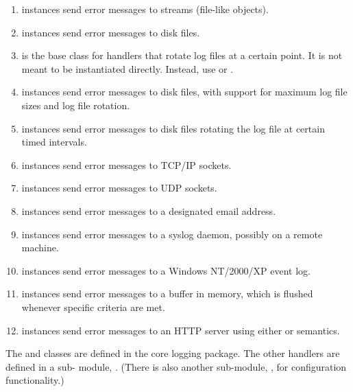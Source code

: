 \begin{enumerate}

\item {} instances send error messages to
streams (file-like objects).

\item {} instances send error messages to disk
files.

\item {} is the base class for handlers that
rotate log files at a certain point. It is not meant to be  instantiated
directly. Instead, use  or
.

\item {} instances send error messages to disk
files, with support for maximum log file sizes and log file rotation.

\item {} instances send error messages to
disk files rotating the log file at certain timed intervals.

\item {} instances send error messages to
TCP/IP sockets.

\item {} instances send error messages to UDP
sockets.

\item {} instances send error messages to a
designated email address.

\item {} instances send error messages to a
\UNIX{} syslog daemon, possibly on a remote machine.

\item {} instances send error messages to a
Windows NT/2000/XP event log.

\item {} instances send error messages to a
buffer in memory, which is flushed whenever specific criteria are
met.

\item {} instances send error messages to an
HTTP server using either  or  semantics.

\end{enumerate}

The  and  classes are defined
in the core logging package. The other handlers are defined in a sub-
module, . (There is also another sub-module,
, for configuration functionality.)

